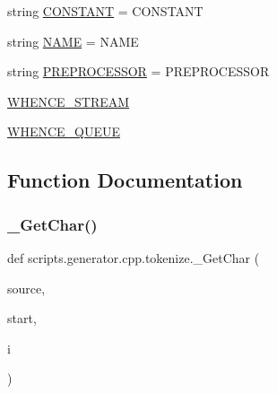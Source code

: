 \begin{DoxyCompactItemize}
\item 
string \mbox{\hyperlink{namespacescripts_1_1generator_1_1cpp_1_1tokenize_a8beeceeb6b7ed20dc86219a81a667a5e}{C\+O\+N\+S\+T\+A\+NT}} = \textquotesingle{}C\+O\+N\+S\+T\+A\+NT\textquotesingle{}
\item 
string \mbox{\hyperlink{namespacescripts_1_1generator_1_1cpp_1_1tokenize_a9ad8912ef794e5a7e4971d818f8a050d}{N\+A\+ME}} = \textquotesingle{}N\+A\+ME\textquotesingle{}
\item 
string \mbox{\hyperlink{namespacescripts_1_1generator_1_1cpp_1_1tokenize_a1e2a7c28f95726ab2f0d3b491ddc0d70}{P\+R\+E\+P\+R\+O\+C\+E\+S\+S\+OR}} = \textquotesingle{}P\+R\+E\+P\+R\+O\+C\+E\+S\+S\+OR\textquotesingle{}
\item 
\mbox{\hyperlink{namespacescripts_1_1generator_1_1cpp_1_1tokenize_a2535617a0a968dbe861fa90f427a36f2}{W\+H\+E\+N\+C\+E\+\_\+\+S\+T\+R\+E\+AM}}
\item 
\mbox{\hyperlink{namespacescripts_1_1generator_1_1cpp_1_1tokenize_a25bc661c759185a5fd6a9710fef73894}{W\+H\+E\+N\+C\+E\+\_\+\+Q\+U\+E\+UE}}
\end{DoxyCompactItemize}


\subsection{Function Documentation}
\mbox{\label{namespacescripts_1_1generator_1_1cpp_1_1tokenize_af68b9aec67dcebb9b919b7ec8a230d78}} 
\subsubsection{\texorpdfstring{\_GetChar()}{\_GetChar()}}
{\footnotesize\ttfamily def scripts.\+generator.\+cpp.\+tokenize.\+\_\+\+Get\+Char (\begin{DoxyParamCaption}\item[{}]{source,  }\item[{}]{start,  }\item[{}]{i }\end{DoxyParamCaption})\hspace{0.3cm}{\ttfamily [private]}}

\mbox{\label{namespacescripts_1_1generator_1_1cpp_1_1tokenize_a2fdc7cdc1c5bf1b4ac06a620b56da9a0}} 
